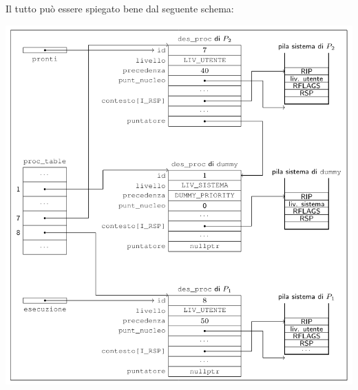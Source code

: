 \documentclass[a4paper,11pt]{article}
\begin{document}
\par\bigskip

\noindent
\begin{minipage}{\textwidth}
Il tutto può essere spiegato bene dal seguente schema:
\begin{center}
	\includegraphics[scale=0.7]{../figures/des_proc_struct.png}
\end{center}
\end{minipage}

\par\bigskip
\end{document}
